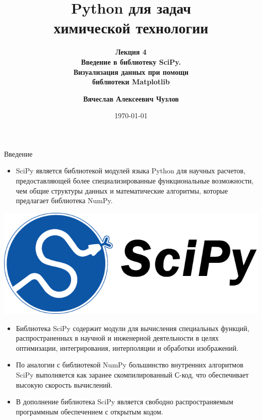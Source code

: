 \documentclass[aspectratio=169, mathserif]{beamer}	%
\title{Python для задач \\ химической технологии}
\subtitle{\textcolor{tpugreen}{\textbf{Лекция 4}} \\ \textbf{Введение в библиотеку SciPy. \\ Визуализация данных при помощи \\ библиотеки Matplotlib}}
\author[]{\textbf{Вячеслав Алексеевич Чузлов}}
\institute{к.т.н., доцент ОХИ ИШПР}
\date{\today}
\begin{document}

\titleframe		%

\tocframe{}		%



\begin{frame}[fragile, label=c]{Введение}
\scriptsize
\begin{minipage}{.73\linewidth}
\begin{itemize}
	\item SciPy является библиотекой модулей языка Python для научных расчетов, предоставляющей более специализированные функциональные возможности, чем общие структуры данных и математические алгоритмы, которые предлагает библиотека NumPy.
\end{itemize}
\end{minipage}
\begin{minipage}{.25\linewidth}
	\includegraphics[width=\linewidth]{./pics/scipy_logo}
\end{minipage}
\begin{itemize}
	\item Библиотека SciPy содержит модули для вычисления специальных функций, распространенных в  научной и инженерной деятельности в целях оптимизации, интегрирования, интерполяции и обработки изображений.
	\item 	По аналогии с библиотекой NumPy большинство внутренних алгоритмов SciPy выполняется как заранее скомпилированный С-код, что обеспечивает высокую скорость вычислений.
	\item В дополнение библиотека SciPy является свободно распространяемым программным обеспечением с открытым кодом.
\end{itemize}
\vfill
\end{frame}
\end{document}
